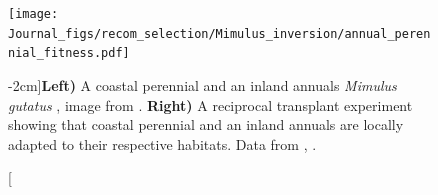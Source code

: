 \begin{figure} %
\begin{center}
\texttt{[image: Journal\_figs/recom\_selection/Mimulus\_inversion/annual\_perennial\_fitness.pdf]}
\end{center}
\caption[][-2cm]{{\bf Left)} A coastal perennial and an inland annuals {\it Mimulus gutatus} \citet{lowry2010widespread}, image from \citet{lowry2010widespread} \PLOSccBY. {\bf Right)} A reciprocal transplant experiment showing that coastal perennial and an inland annuals are locally adapted to their respective habitats. Data from  \citet{lowry2010widespread}, . 
}\label{fig:annual_perennial_fitness}
\end{figure}


